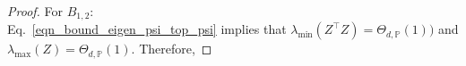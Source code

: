 \documentclass{article}
\theoremstyle{plain}
\theoremstyle{definition}
\theoremstyle{remark}
\begin{document}
\begin{appendix}
\begin{proof}
For $B_{1,2}$:\\
Eq.~\eqref{eqn_bound_eigen_psi_top_psi} implies that $\lambda_{\min}(Z^{\top}Z)=\Theta_{d,\mathbb{P}}(1))$ and $\lambda_{\max}(Z)=\Theta_{d,\mathbb{P}}(1)$. Therefore, 

\end{proof}
\end{appendix}
\end{document}
